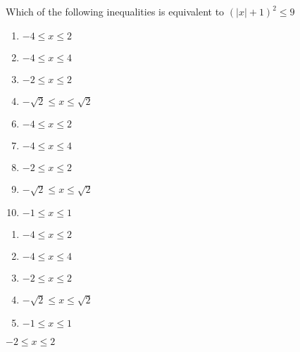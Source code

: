 Which of the following inequalities is equivalent to $(|\textit{x}|+1)^2\leq9$

\ifsat
	\begin{enumerate}[label=\Alph*)]
		\item   $-4 \leq \textit{x} \leq 2$
		\item  $-4 \leq \textit{x} \leq 4$ 
		\item  $-2 \leq \textit{x} \leq 2$ %
		\item  $-\sqrt{2} \leq \textit{x} \leq \sqrt{2}$ 
	\end{enumerate}
\else
\fi

\ifacteven
	\begin{enumerate}[label=\textbf{\Alph*.},itemsep=\fill,align=left]
		\setcounter{enumii}{5}
		\item   $-4 \leq \textit{x} \leq 2$
		\item  $-4 \leq \textit{x} \leq 4$ 
		\item  $-2 \leq \textit{x} \leq 2$ %
		\addtocounter{enumii}{1}
		\item  $-\sqrt{2} \leq \textit{x} \leq \sqrt{2}$ 
		\item  $-1 \leq \textit{x} \leq 1$
	\end{enumerate}
\else
\fi

\ifactodd
	\begin{enumerate}[label=\textbf{\Alph*.},itemsep=\fill,align=left]
		\item   $-4 \leq \textit{x} \leq 2$
		\item  $-4 \leq \textit{x} \leq 4$ 
		\item  $-2 \leq \textit{x} \leq 2$ %
		\item  $-\sqrt{2} \leq \textit{x} \leq \sqrt{2}$ 
		\item  $-1 \leq \textit{x} \leq 1$ 
	\end{enumerate}
\else
\fi

\ifgridin
  $-2 \leq \textit{x} \leq 2$ %
		
\else
\fi

